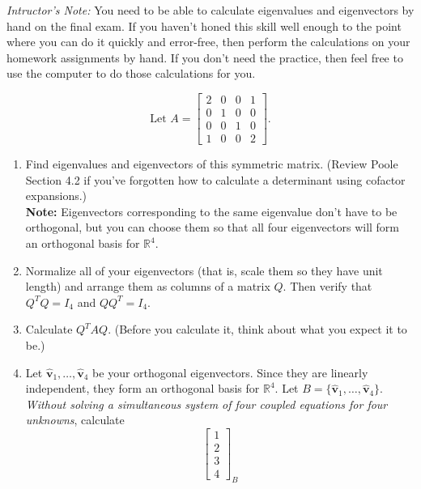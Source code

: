 \documentclass[12pt,letterpaper]{hmcpset}
\newcommand{\RR}{\mathbb{R}}
\newcommand{\m}[1]{\begin{bmatrix} #1 \end{bmatrix}}
\newcommand{\hatbf}[1]{\hat{\mathbf{#1}}}
\begin{document}

\noindent
\emph{Intructor's Note:} You need to be able to calculate eigenvalues
and eigenvectors by hand on the final exam. If you haven't honed this
skill well enough to the point where you can do it quickly and
error-free, then perform the calculations on your homework assignments
by hand. If you don't need the practice, then feel free to use the
computer to do those calculations for you.

\begin{problem}[1]
    \[
        \text{Let }A=\m{2&0&0&1\\0&1&0&0\\0&0&1&0\\1&0&0&2}.
    \]
    \begin{enumerate}
        \item Find eigenvalues and eigenvectors of this symmetric
            matrix. (Review Poole Section 4.2 if you've forgotten how to
            calculate a determinant using cofactor expansions.)\\
            \textbf{Note:} Eigenvectors corresponding to the same
            eigenvalue don't have to be orthogonal, but you can choose
            them so that all four eigenvectors will form an orthogonal
            basis for $\RR^4$.
        \item Normalize all of your eigenvectors (that is, scale them
            so they have unit length) and arrange them as columns of a
            matrix $Q$. Then verify that $Q^TQ=I_4$ and $QQ^T=I_4$.
        \item Calculate $Q^TAQ$. (Before you calculate it, think about
            what you expect it to be.)
        \item Let $\hatbf{v}_1,\dots,\hatbf{v}_4$ be your orthogonal
            eigenvectors. Since they are linearly independent, they form
            an orthogonal basis for $\RR^4$. Let
            $B=\{\hatbf{v}_1,\dots,\hatbf{v}_4\}$. \textit{Without solving
            a simultaneous system of four coupled equations for four
            unknowns}, calculate
            \[
                \m{1\\2\\3\\4}_B
            \]
    \end{enumerate}
\end{problem}
\newpage
\begin{solution}
    \null\vfill
\end{solution}
\newpage
\end{document}
